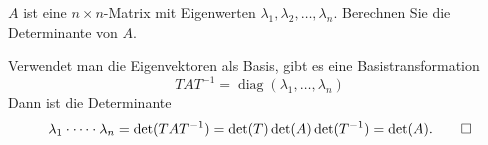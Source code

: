 $A$ ist eine $n\times n$-Matrix mit Eigenwerten
$\lambda_1,\lambda_2,\dots,\lambda_n$.
Berechnen Sie die Determinante von $A$.

\begin{loesung}
Verwendet man die Eigenvektoren als Basis, gibt es eine Basistransformation
\[
TAT^{-1}=\operatorname{diag}(\lambda_1,\dots,\lambda_n)
\]
Dann ist die Determinante
\[
\lambda_1\cdot \dots\cdot\lambda_n
=
\det(TAT^{-1})
=
\det(T)\det(A)\det(T^{-1})
=
\det(A).
\qedhere
\]
\end{loesung}
